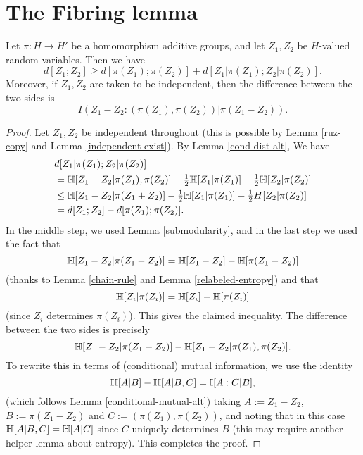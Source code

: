 \chapter{The Fibring lemma}

\begin{proposition}\label{fibring-ident}
  \leanok
  Let $\pi : H \to H'$ be a homomorphism additive groups, and let $Z_1,Z_2$ be $H$-valued random variables. Then we have
  \[
    d[Z_1; Z_2] \geq d[\pi(Z_1);\pi(Z_2)] + d[Z_1|\pi(Z_1); Z_2 |\pi(Z_2)].
  \]
  Moreover, if $Z_1,Z_2$ are taken to be independent, then the difference between the two sides is
$$I( Z_1 - Z_2 : (\pi(Z_1), \pi(Z_2))  |  \pi(Z_1 - Z_2) ).$$
\end{proposition}


\begin{proof}\leanok
  Let $Z_1,Z_2$ be independent throughout (this is possible by Lemma \ref{ruz-copy} and Lemma \ref{independent-exist}).  By Lemma \ref{cond-dist-alt}, We have
  \begin{align*}
    & d[Z_1  |\pi(Z_1); Z_2 |\pi(Z_2)] \\
    & = \mathbb{H}[Z_1 - Z_2 | \pi(Z_1),\pi(Z_2)] - \tfrac{1}{2} \mathbb{H}[Z_1 | \pi(Z_1)] - \tfrac{1}{2} \mathbb{H}[Z_2 | \pi(Z_2)] \\
    & \leq  \mathbb{H}[Z_1 - Z_2 | \pi(Z_1+Z_2)]  - \tfrac{1}{2} \mathbb{H}[Z_1 | \pi(Z_1)] - \tfrac{1}{2}H[Z_2 | \pi(Z_2)] \\
    & = d[Z_1;Z_2] - d[\pi(Z_1);\pi(Z_2)].
  \end{align*}
  In the middle step, we used Lemma \ref{submodularity}, and in the last step we used the fact that
  \[\mathbb{H}[Z_1 - Z_2 |  \pi(Z_1-Z_2)] = \mathbb{H}[Z_1 - Z_2] - \mathbb{H}[\pi(Z_1-Z_2)]\]
  (thanks to Lemma \ref{chain-rule} and Lemma \ref{relabeled-entropy}) and that
  \[\mathbb{H}[Z_i| \pi(Z_i)] = \mathbb{H}[Z_i] - \mathbb{H}[\pi(Z_i)]\] (since $Z_i$ determines $\pi(Z_i)$).
  This gives the claimed inequality. The difference between the two sides is precisely
  \[\mathbb{H}[Z_1 - Z_2  | \pi(Z_1 - Z_2)] - \mathbb{H}[Z_1 - Z_2  | \pi(Z_1),\pi(Z_2)].\]
  To rewrite this in terms of (conditional) mutual information, we use the identity
  \[\mathbb{H}[A|B] - \mathbb{H}[A | B,C] = \mathbb{I}[A : C | B],\]
  (which follows Lemma \ref{conditional-mutual-alt})
  taking
  $A := Z_1 - Z_2$, $B := \pi(Z_1 - Z_2)$ and $C := (\pi(Z_1),\pi(Z_{2}))$, and noting that in this case $\mathbb{H}[A | B,C] = \mathbb{H}[A | C]$ since $C$ uniquely determines $B$ (this may require another helper lemma about entropy).
  This completes the proof.
\end{proof}



